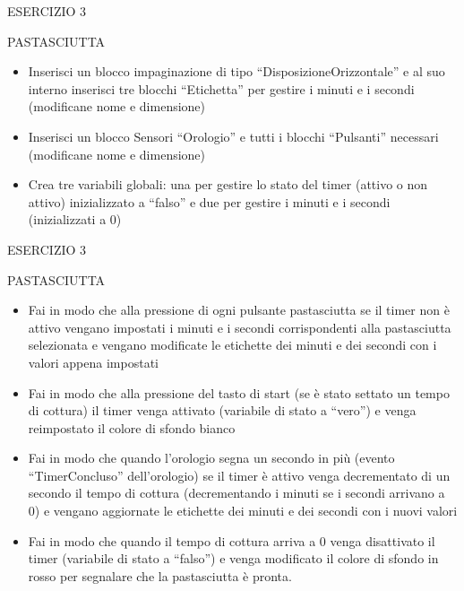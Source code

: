\documentclass[aspectratio=1610]{beamer}
\begin{document}
\begin{frame}{ESERCIZIO 3}
    \begin{alertblock}{PASTASCIUTTA}
        \begin{minipage}{0.96\linewidth}
            \begin{itemize}
                \justifying
                \item Inserisci un blocco impaginazione di tipo ``DisposizioneOrizzontale'' e al suo interno 
                inserisci tre blocchi ``Etichetta'' per gestire i minuti e i secondi (modificane nome e dimensione)
                \pause
                \item Inserisci un blocco Sensori ``Orologio'' e tutti i blocchi ``Pulsanti'' necessari (modificane nome e dimensione)
                \pause
                \item Crea tre variabili globali: una per gestire lo stato del timer (attivo o non attivo) inizializzato a ``falso'' 
                e due per gestire i minuti e i secondi (inizializzati a 0)
            \end{itemize}
        \end{minipage}
    \end{alertblock}
\end{frame}

\begin{frame}{ESERCIZIO 3}
    \begin{alertblock}{PASTASCIUTTA}
        \begin{minipage}{0.96\linewidth}
            \begin{itemize}
                \justifying
                \item Fai in modo che alla pressione di ogni pulsante pastasciutta se il timer non è attivo vengano 
                impostati i minuti e i secondi corrispondenti alla pastasciutta selezionata e vengano modificate 
                le etichette dei minuti e dei secondi con i valori appena impostati
                \pause
                \item Fai in modo che alla pressione del tasto di start (se è stato settato un tempo di cottura) il timer 
                venga attivato (variabile di stato a ``vero'') e venga reimpostato il colore di sfondo bianco
                \pause
                \item Fai in modo che quando l'orologio segna un secondo in più (evento ``TimerConcluso'' dell'orologio) 
                se il timer è attivo venga decrementato di un secondo il tempo di cottura (decrementando i minuti se i secondi arrivano a 0) 
                e vengano aggiornate le etichette dei minuti e dei secondi con i nuovi valori
                \pause
                \item Fai in modo che quando il tempo di cottura arriva a 0 venga disattivato il timer (variabile di stato a ``falso'') e venga
                modificato il colore di sfondo in rosso per segnalare che la pastasciutta è pronta.
            \end{itemize}
        \end{minipage}
    \end{alertblock}
\end{frame}
\end{document}
